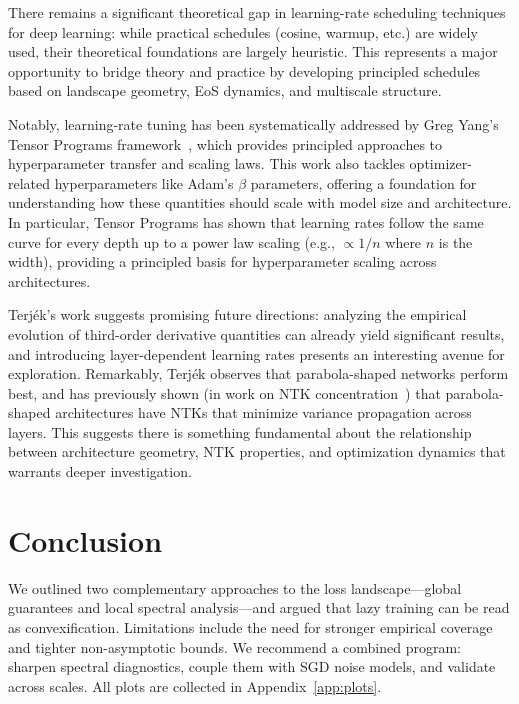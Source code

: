 \documentclass[12pt]{article}
\begin{document}
There remains a significant theoretical gap in learning-rate scheduling techniques for deep learning: while practical schedules (cosine, warmup, etc.) are widely used, their theoretical foundations are largely heuristic. This represents a major opportunity to bridge theory and practice by developing principled schedules based on landscape geometry, EoS dynamics, and multiscale structure.

Notably, learning-rate tuning has been systematically addressed by Greg Yang's Tensor Programs framework~\cite{yang2022tensorprogramsvtuning}, which provides principled approaches to hyperparameter transfer and scaling laws. This work also tackles optimizer-related hyperparameters like Adam's \(\beta\) parameters, offering a foundation for understanding how these quantities should scale with model size and architecture. In particular, Tensor Programs has shown that learning rates follow the same curve for every depth up to a power law scaling (e.g., \(\propto 1/n\) where \(n\) is the width), providing a principled basis for hyperparameter scaling across architectures.

Terj\'ek's work suggests promising future directions: analyzing the empirical evolution of third-order derivative quantities can already yield significant results, and introducing layer-dependent learning rates presents an interesting avenue for exploration. Remarkably, Terj\'ek observes that parabola-shaped networks perform best, and has previously shown (in work on NTK concentration~\cite{terjek2025mlpseocconcentrationntk}) that parabola-shaped architectures have NTKs that minimize variance propagation across layers. This suggests there is something fundamental about the relationship between architecture geometry, NTK properties, and optimization dynamics that warrants deeper investigation.

\section{Conclusion}
We outlined two complementary approaches to the loss landscape---global guarantees and local spectral analysis---and argued that lazy training can be read as convexification. Limitations include the need for stronger empirical coverage and tighter non-asymptotic bounds. We recommend a combined program: sharpen spectral diagnostics, couple them with SGD noise models, and validate across scales. All plots are collected in Appendix~\ref{app:plots}.
\end{document}
